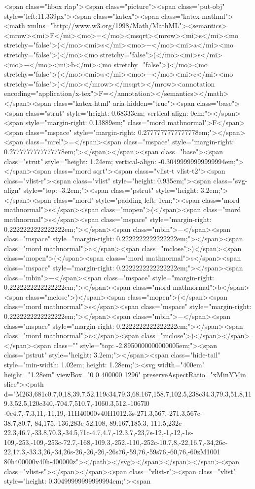 <span class="hbox rlap"><span class="picture"><span class="put-obj" style="left:11.339px"><span class="katex"><span class="katex-mathml"><math xmlns="http://www.w3.org/1998/Math/MathML"><semantics><mrow><mi>F</mi><mo>=</mo><msqrt><mrow><mi>s</mi><mo stretchy="false">(</mo><mi>s</mi><mo>−</mo><mi>a</mi><mo stretchy="false">)</mo><mo stretchy="false">(</mo><mi>s</mi><mo>−</mo><mi>b</mi><mo stretchy="false">)</mo><mo stretchy="false">(</mo><mi>s</mi><mo>−</mo><mi>c</mi><mo stretchy="false">)</mo></mrow></msqrt></mrow><annotation encoding="application/x-tex">F=</annotation></semantics></math></span><span class="katex-html" aria-hidden="true"><span class="base"><span class="strut" style="height: 0.68333em; vertical-align: 0em;"></span><span style="margin-right: 0.13889em;" class="mord mathnormal">F</span><span class="mspace" style="margin-right: 0.2777777777777778em;"></span><span class="mrel">=</span><span class="mspace" style="margin-right: 0.2777777777777778em;"></span></span><span class="base"><span class="strut" style="height: 1.24em; vertical-align: -0.30499999999999994em;"></span><span class="mord sqrt"><span class="vlist-t vlist-t2"><span class="vlist-r"><span class="vlist" style="height: 0.935em;"><span class="svg-align" style="top: -3.2em;"><span class="pstrut" style="height: 3.2em;"></span><span class="mord" style="padding-left: 1em;"><span class="mord mathnormal">s</span><span class="mopen">(</span><span class="mord mathnormal">s</span><span class="mspace" style="margin-right: 0.2222222222222222em;"></span><span class="mbin">−</span><span class="mspace" style="margin-right: 0.2222222222222222em;"></span><span class="mord mathnormal">a</span><span class="mclose">)</span><span class="mopen">(</span><span class="mord mathnormal">s</span><span class="mspace" style="margin-right: 0.2222222222222222em;"></span><span class="mbin">−</span><span class="mspace" style="margin-right: 0.2222222222222222em;"></span><span class="mord mathnormal">b</span><span class="mclose">)</span><span class="mopen">(</span><span class="mord mathnormal">s</span><span class="mspace" style="margin-right: 0.2222222222222222em;"></span><span class="mbin">−</span><span class="mspace" style="margin-right: 0.2222222222222222em;"></span><span class="mord mathnormal">c</span><span class="mclose">)</span></span></span><span class="" style="top: -2.8950000000000005em;"><span class="pstrut" style="height: 3.2em;"></span><span class="hide-tail" style="min-width: 1.02em; height: 1.28em;"><svg width="400em" height="1.28em" viewBox="0 0 400000 1296" preserveAspectRatio="xMinYMin slice"><path d="M263,681c0.7,0,18,39.7,52,119c34,79.3,68.167,158.7,102.5,238c34.3,79.3,51.8,119.3,52.5,120c340,-704.7,510.7,-1060.3,512,-1067l0 -0c4.7,-7.3,11,-11,19,-11H40000v40H1012.3s-271.3,567,-271.3,567c-38.7,80.7,-84,175,-136,283c-52,108,-89.167,185.3,-111.5,232c-22.3,46.7,-33.8,70.3,-34.5,71c-4.7,4.7,-12.3,7,-23,7s-12,-1,-12,-1s-109,-253,-109,-253c-72.7,-168,-109.3,-252,-110,-252c-10.7,8,-22,16.7,-34,26c-22,17.3,-33.3,26,-34,26s-26,-26,-26,-26s76,-59,76,-59s76,-60,76,-60zM1001 80h400000v40h-400000z"></path></svg></span></span></span><span class="vlist-s">​</span></span><span class="vlist-r"><span class="vlist" style="height: 0.30499999999999994em;"><span 